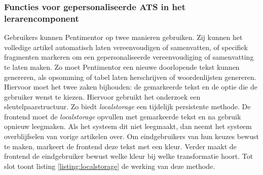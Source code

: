 \subsubsection{Functies voor gepersonaliseerde ATS in het lerarencomponent}

Gebruikers kunnen Pentimentor op twee manieren gebruiken. Zij kunnen het volledige artikel automatisch laten vereenvoudigen of samenvatten, of specifiek fragmenten markeren om een gepersonaliseerde vereenvoudiging of samenvatting te laten maken. Zo moet Pentimentor een nieuwe doorlopende tekst kunnen genereren, als opsomming of tabel laten herschrijven of woordenlijsten genereren. Hiervoor moet het twee zaken bijhouden: de gemarkeerde tekst en de optie die de gebruiker wenst te kiezen. Hiervoor gebruikt het onderzoek een sleutelpaarstructuur. Zo biedt \textit{localstorage} een tijdelijk persistente methode. De frontend moet de \textit{localstorage} opvullen met gemarkeerde tekst en na gebruik opnieuw leegmaken. Als het systeem dit niet leegmaakt, dan neemt het systeem overblijfselen van vorige artikelen over. Om eindgebruikers van hun keuzes bewust te maken, markeert de frontend deze tekst met een kleur. Verder maakt de frontend de eindgebruiker bewust welke kleur bij welke transformatie hoort. Tot slot toont listing \ref{listing:localstorage} de werking van deze methode.

